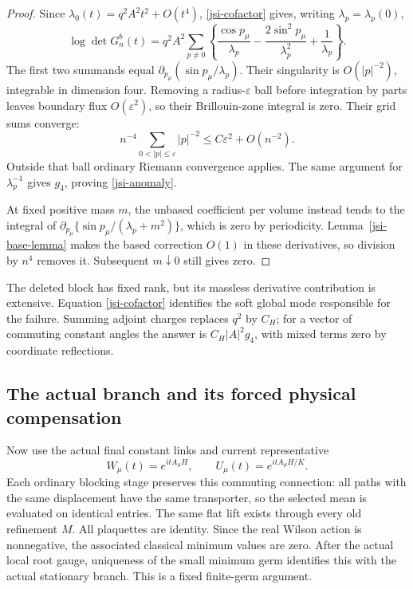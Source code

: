 \begin{proof}
Since \(\lambda_0(t)=q^2A^2t^2+O(t^4)\),
\eqref{jsi-cofactor} gives, writing \(\lambda_p=\lambda_p(0)\),
\begin{equation}
 [t^2]\log\det G_n^b(t)
   =q^2A^2\sum_{p\ne0}
    \left\{\frac{\cos p_\mu}{\lambda_p}
       -\frac{2\sin^2p_\mu}{\lambda_p^2}
       +\frac1{\lambda_p}\right\}.
 \label{jsi-cofactor-jet}
\end{equation}
The first two summands equal
\(\partial_{p_\mu}(\sin p_\mu/\lambda_p)\).
Their singularity is \(O(|p|^{-2})\), integrable in dimension
four. Removing a radius-\(\varepsilon\) ball before integration
by parts leaves boundary flux \(O(\varepsilon^2)\), so their
Brillouin-zone integral is zero. Their grid sums converge:
\begin{equation}
 n^{-4}\sum_{0<|p|\le\varepsilon}|p|^{-2}
                       \le C\varepsilon^2+O(n^{-2}).
 \label{jsi-grid-bound}
\end{equation}
Outside that ball ordinary Riemann convergence applies.
The same argument for \(\lambda_p^{-1}\) gives \(g_4\),
proving \eqref{jsi-anomaly}.

At fixed positive mass \(m\), the unbased coefficient per volume
instead tends to the integral of
\(\partial_{p_\mu}\{\sin p_\mu/(\lambda_p+m^2)\}\),
which is zero by periodicity. Lemma~\ref{jsi-base-lemma}
makes the based correction \(O(1)\) in these derivatives,
so division by \(n^4\) removes it. Subsequent \(m\downarrow0\)
still gives zero.
\end{proof}

The deleted block has fixed rank, but its massless derivative
contribution is extensive. Equation \eqref{jsi-cofactor} identifies
the soft global mode responsible for the failure. Summing
adjoint charges replaces \(q^2\) by \(C_H\); for a vector of
commuting constant angles the answer is \(C_H|A|^2g_4\),
with mixed terms zero by coordinate reflections.

\subsection{The actual branch and its forced physical compensation}
\label{jsi-actual-section}

Now use the actual final constant links and current representative
\begin{equation}
 W_\mu(t)=e^{itA_\mu H},\qquad
 U_\mu(t)=e^{itA_\mu H/K}.
 \label{jsi-flat-branch}
\end{equation}
Each ordinary blocking stage preserves this commuting connection:
all paths with the same displacement have the same transporter,
so the selected mean is evaluated on identical entries.
The same flat lift exists through every old refinement \(M\).
All plaquettes are identity. Since the real Wilson action is
nonnegative, the associated classical minimum values are zero.
After the actual local root gauge, uniqueness of the small
minimum germ identifies this with the actual stationary branch.
This is a fixed finite-germ argument.

